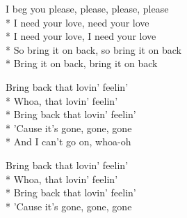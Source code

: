 \begin{SongText}
\begin{SongVerse}
        I beg you please, please, please, please\\*%
        I need your love, need your love\\*%
        I need your love, I need your love\\*%
        So bring it on back, so bring it on back\\*%
        Bring it on back, bring it on back
    \end{SongVerse}
    \begin{SongVerse}
        Bring back that lovin' feelin'\\*%
        Whoa, that lovin' feelin'\\*%
        Bring back that lovin' feelin'\\*%
        'Cause it's gone, gone, gone\\*%
        And I can't go on, whoa-oh
    \end{SongVerse}
    \begin{SongVerse}
        Bring back that lovin' feelin'\\*%
        Whoa, that lovin' feelin'\\*%
        Bring back that lovin' feelin'\\*%
        'Cause it's gone, gone, gone
    \end{SongVerse}

\end{SongText}

